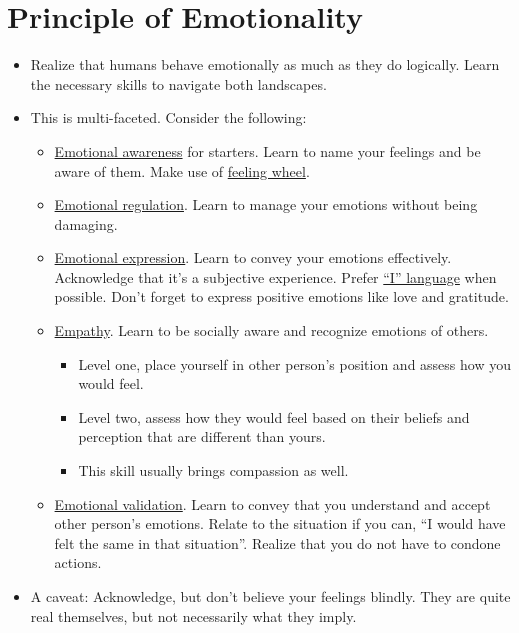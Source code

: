 \documentclass[
]{book}
\providecommand{\tightlist}{%
  \setlength{\itemsep}{0pt}\setlength{\parskip}{0pt}}
\begin{document}
\hypertarget{principle-of-emotionality}{%
\section{Principle of Emotionality}\label{principle-of-emotionality}}

\begin{itemize}
\tightlist
\item
  Realize that humans behave emotionally as much as they do logically.
  Learn the necessary skills to navigate both landscapes.
\item
  This is multi-faceted. Consider the following:

  \begin{itemize}
  \tightlist
  \item
    \href{https://en.wikipedia.org/wiki/Self-awareness}{Emotional awareness} for starters. Learn to name your feelings and be aware of them. Make use of \href{https://commons.wikimedia.org/wiki/File:The_Feeling_Wheel.png}{feeling wheel}.
  \item
    \href{https://en.wikipedia.org/wiki/Emotional_self-regulation}{Emotional regulation}. Learn to manage your emotions without being damaging.
  \item
    \href{https://en.wikipedia.org/wiki/Emotional_expression}{Emotional expression}. Learn to convey your emotions effectively. Acknowledge that it's a subjective experience. Prefer \href{https://en.wikipedia.org/wiki/I-message}{``I'' language} when possible. Don't forget to express positive emotions like love and gratitude.
  \item
    \href{https://en.wikipedia.org/wiki/Empathy}{Empathy}. Learn to be socially aware and recognize emotions of others.

    \begin{itemize}
    \tightlist
    \item
      Level one, place yourself in other person's position and assess how you would feel.
    \item
      Level two, assess how they would feel based on their beliefs and perception that are different than yours.
    \item
      This skill usually brings compassion as well.
    \end{itemize}
  \item
    \href{https://en.wikipedia.org/wiki/Emotional_validation}{Emotional validation}. Learn to convey that you understand and accept other person's emotions. Relate to the situation if you can, ``I would have felt the same in that situation''. Realize that you do not have to condone actions.
  \end{itemize}
\item
  A caveat: Acknowledge, but don't believe your feelings blindly. They are quite real themselves, but not necessarily what they imply.


\end{itemize}
\end{document}
